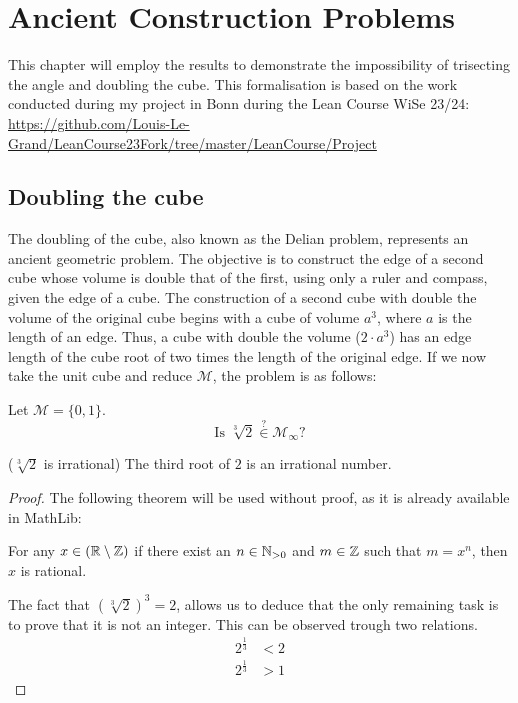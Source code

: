 \chapter{Ancient Construction Problems}
This chapter will employ the results to demonstrate the impossibility of trisecting the angle and doubling the cube. 
This formalisation is based on the work conducted during my project in Bonn during the Lean Course WiSe 23/24: 
\url{https://github.com/Louis-Le-Grand/LeanCourse23Fork/tree/master/LeanCourse/Project}

\section{Doubling the cube}
The doubling of the cube, also known as the Delian problem, represents an ancient geometric problem.
The objective is to construct the edge of a second cube whose volume is double that of the first, using only a ruler and compass, given the edge of a cube.
The construction of a second cube with double the volume of the original cube begins with a cube of volume $a^3$, where $a$ is the length of an edge. 
Thus, a cube with double the volume ($2\cdot a^3$) has an edge length of the cube root of two times the length of the original edge.
If we now take the unit cube and reduce $\mathcal{M}$, the problem is as follows:
\begin{problem}
    Let $\mathcal{M} = \{0,1\}$.  
    $$\text{Is }\sqrt[3]{2} \overset{?}{\in} \mathcal{M}_{\infty}?$$
\end{problem}

\begin{lemma}($\sqrt[3]{2}$ is irrational)
    \label{lem:irrational_thirdroot_two}
    \leanok
    The third root of $2$ is an irrational number.
\end{lemma}
\begin{proof}
    \leanok
    The following theorem will be used without proof, as it is already available in MathLib:
    \begin{theorem*}
        For any $x\in(\mathbb{R}\setminus\mathbb{Z})$ if there exist an $n\in \mathbb{N}_{>0}$ and $m\in\mathbb{Z}$ such that $m = x^n$, then $x$ is rational. 
    \end{theorem*}
    The fact that $(\sqrt[3]{2})^3=2$, allows us to deduce that the only remaining task is to prove that it  is not an integer. 
    This can be observed trough two relations.
    \begin{align}
        2^{\frac{1}{3}} &< 2 \\
        2^{\frac{1}{3}} &> 1
    \end{align}
\end{proof}


